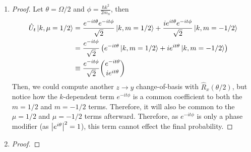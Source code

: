 \begin{enumerate}
\begin{proof}
    thus,
    \begin{align*}
      \hat{U}_t \ket{k,m=\frac{1}{2}} &= \exp(-it \left[ \frac{\Omega}{2} + \frac{\hbar k^2}{2m_n} \right] ) \ket{k,m=\frac{1}{2}} \\
      \hat{U}_t \ket{k,m=-\frac{1}{2}} &= \exp(it \left[ \frac{\Omega}{2} - \frac{\hbar k^2}{2m_n} \right] ) \ket{k,m=-\frac{1}{2}} 
    \end{align*}
    and therefore, altogether,
  \begin{align*}
    \hat{U}_t \ket{k, \mu = \frac{1}{2}} =
    &\frac{1}{\sqrt{2}}
    \exp(-it\left( \frac{\Omega}{2} + \frac{\hbar k^2}{2 m_n} \right))
    \ket{k, m=\frac{1}{2}} + \\
    &\frac{i}{\sqrt{2}}
    \exp(it\left( \frac{\Omega}{2} - \frac{\hbar k^2}{2 m_n} \right))
    \ket{k, m=-\frac{1}{2}}
  \end{align*}
  \end{proof}
\item[7.10] 
  \begin{proof}
    Let $\theta=\Omega/2$ and $\phi = \frac{\hbar k^2}{2 m_n}$, then
    \begin{align*}
      \hat{U}_t \ket{k,\mu = 1/2} &= \frac{e^{-it\theta} e^{-it\phi}}{\sqrt{2}} \ket{k,m=1/2} + \frac{i e^{it\theta} e^{-it\phi}}{\sqrt{2}} \ket{k,m=-1/2} \\
      &= \frac{e^{-it\phi}}{\sqrt{2}} \left( e^{-it\theta} \ket{k,m=1/2} + ie^{it\theta} \ket{k,m=-1/2} \right) \\
      &\equiv \frac{e^{-it\phi}}{\sqrt{2}} \binom{ e^{-it\theta} }{ ie^{it\theta} }
    \end{align*}
    Then, we could compute another $z \to y$ change-of-basis with $\hat{R}_x(\theta/2)$, but notice how the $k$-dependent term $e^{-it\phi}$ is a common coefficient to both the $m=1/2$ and $m=-1/2$ terms. Therefore, it will also be common to the $\mu=1/2$ and $\mu=-1/2$ terms afterward. Therefore, as $e^{-it\phi}$ is only a phase modifier (as $\abs{e^{i\theta}}^2=1$), this term cannot effect the final probability.
  \end{proof}
\item[7.12] 
  \begin{proof}

\end{proof}
\end{enumerate}
